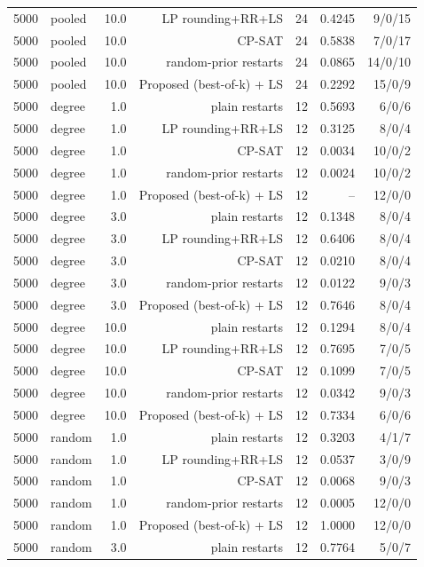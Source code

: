 \begin{table}[t]
\begin{tabular}{llrrrrr}
5000 & pooled & 10.0 & LP rounding+RR+LS & 24 & 0.4245 & 9/0/15 \\
5000 & pooled & 10.0 & CP-SAT & 24 & 0.5838 & 7/0/17 \\
5000 & pooled & 10.0 & random-prior restarts & 24 & 0.0865 & 14/0/10 \\
5000 & pooled & 10.0 & Proposed (best-of-k) + LS & 24 & 0.2292 & 15/0/9 \\
5000 & degree & 1.0 & plain restarts & 12 & 0.5693 & 6/0/6 \\
5000 & degree & 1.0 & LP rounding+RR+LS & 12 & 0.3125 & 8/0/4 \\
5000 & degree & 1.0 & CP-SAT & 12 & 0.0034 & 10/0/2 \\
5000 & degree & 1.0 & random-prior restarts & 12 & 0.0024 & 10/0/2 \\
5000 & degree & 1.0 & Proposed (best-of-k) + LS & 12 & -- & 12/0/0 \\
5000 & degree & 3.0 & plain restarts & 12 & 0.1348 & 8/0/4 \\
5000 & degree & 3.0 & LP rounding+RR+LS & 12 & 0.6406 & 8/0/4 \\
5000 & degree & 3.0 & CP-SAT & 12 & 0.0210 & 8/0/4 \\
5000 & degree & 3.0 & random-prior restarts & 12 & 0.0122 & 9/0/3 \\
5000 & degree & 3.0 & Proposed (best-of-k) + LS & 12 & 0.7646 & 8/0/4 \\
5000 & degree & 10.0 & plain restarts & 12 & 0.1294 & 8/0/4 \\
5000 & degree & 10.0 & LP rounding+RR+LS & 12 & 0.7695 & 7/0/5 \\
5000 & degree & 10.0 & CP-SAT & 12 & 0.1099 & 7/0/5 \\
5000 & degree & 10.0 & random-prior restarts & 12 & 0.0342 & 9/0/3 \\
5000 & degree & 10.0 & Proposed (best-of-k) + LS & 12 & 0.7334 & 6/0/6 \\
5000 & random & 1.0 & plain restarts & 12 & 0.3203 & 4/1/7 \\
5000 & random & 1.0 & LP rounding+RR+LS & 12 & 0.0537 & 3/0/9 \\
5000 & random & 1.0 & CP-SAT & 12 & 0.0068 & 9/0/3 \\
5000 & random & 1.0 & random-prior restarts & 12 & 0.0005 & 12/0/0 \\
5000 & random & 1.0 & Proposed (best-of-k) + LS & 12 & 1.0000 & 12/0/0 \\
5000 & random & 3.0 & plain restarts & 12 & 0.7764 & 5/0/7 \\

\end{tabular}
\end{table}

